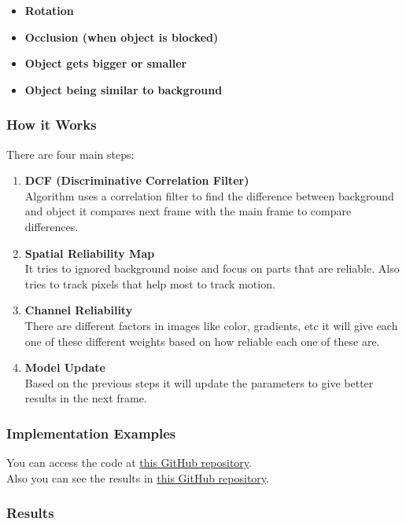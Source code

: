 \documentclass[a4paper,12pt]{article}
\begin{document}
\begin{itemize}
    \item \textbf{Rotation}
    \item \textbf{Occlusion (when object is blocked)}
    \item \textbf{Object gets bigger or smaller}
    \item \textbf{Object being similar to background}
\end{itemize}

\subsubsection{How it Works}

There are four main steps:
\begin{enumerate}
    \item \textbf{DCF (Discriminative Correlation Filter)} \\
        Algorithm uses a correlation filter to find the difference between background and object it compares next frame with the main frame to compare differences.
    \item \textbf{Spatial Reliability Map} \\
        It tries to ignored background noise and focus on parts that are reliable. Also tries to track pixels that help most to track motion.
    \item \textbf{Channel Reliability} \\
        There are different factors in images like color, gradients, etc it will give each one of these different weights based on how reliable each one of these are.
    \item \textbf{Model Update} \\
        Based on the previous steps it will update the parameters to give better results in the next frame.
\end{enumerate}

\subsubsection{Implementation Examples}

You can access the code at \href{https://github.com/amirali83/Signal_Project_2025/tree/main/Codes/Tracking}{this GitHub repository}. \\
Also you can see the results in \href{https://github.com/amirali83/Signal_Project_2025/tree/main/Results/CSRT}{this GitHub repository}.

\subsubsection{Results}
\end{document}
